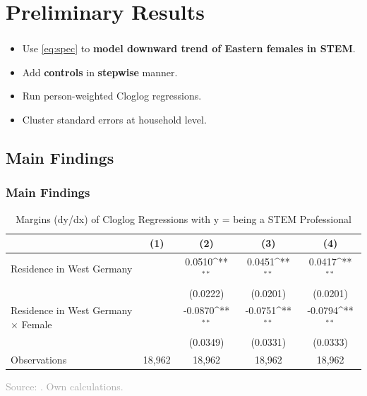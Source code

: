 \documentclass[11pt, aspectratio=1610, xcolor={dvipsnames}]{beamer}
\newcommand{\highlight}[1]{\textbf{\textcolor{PineGreen}{#1}}}
\def\sym#1{\ifmmode^{#1}\else\(^{#1}\)\fi}
\begin{document}
	\section{Preliminary Results}
	\begin{frame}
		\frametitle{}
		
		\begin{itemize}
			\item Use \eqref{eq:spec} to \highlight{model downward trend of Eastern females in STEM}.
			\item Add \highlight{controls} in \highlight{stepwise} manner.
			\item Run person-weighted Cloglog regressions.
			\item Cluster standard errors at household level.
		\end{itemize}
		
	\end{frame}
	
	\subsection{Main Findings}
	\begin{frame}
		\frametitle{Main Findings}
		
		{\linespread{1}\tiny
			\begin{table}[h]
				\centering
				\caption{Margins (dy/dx) of Cloglog Regressions with y = being a STEM Professional}
				\label{tab:margins1}
				\begin{tabular}{p{25em}*{4}{c}}
					\toprule
					&\multicolumn{1}{c}{(1)}         &\multicolumn{1}{c}{(2)}         &\multicolumn{1}{c}{(3)}         &\multicolumn{1}{c}{(4)}         \\
					\midrule
					Residence in West Germany&                     &      0.0510\sym{**} &      0.0451\sym{**} &      0.0417\sym{**} \\
					&                     &    (0.0222)         &    (0.0201)         &    (0.0201)         \\
					\addlinespace
					Residence in West Germany $\times$ Female&                     &     -0.0870\sym{**} &     -0.0751\sym{**} &     -0.0794\sym{**} \\
					&                     &    (0.0349)         &    (0.0331)         &    (0.0333)         \\
					\midrule
					Observations        &       18,962         &       18,962         &       18,962         &       18,962         \\
					\bottomrule
				\end{tabular}
			\end{table}
		}
		
		{\scriptsize
			\textcolor{darkgray}{Source: \cite{SOEP2023}. Own calculations.}
		}
		
	\end{frame}
	
\end{document}
